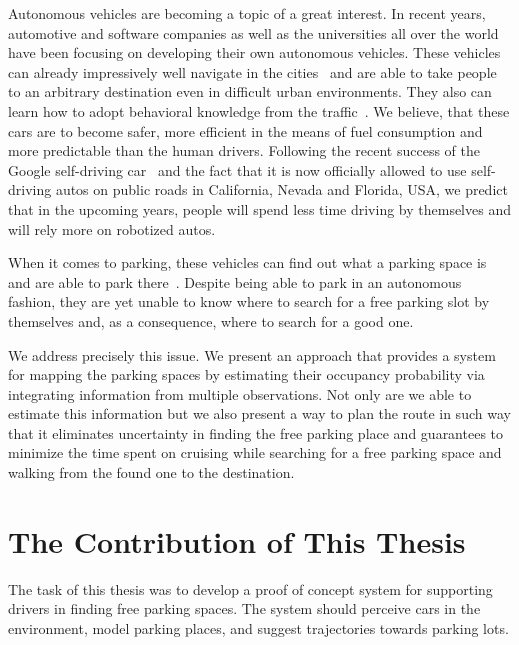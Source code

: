 Autonomous vehicles are becoming a topic of a great interest. In recent years,
automotive and software companies as well as the universities all over the
world have been focusing on developing their own autonomous vehicles. These
vehicles can already impressively well navigate in the
cities~\cite{stanley_auto_car,perceprion_drivec_car,lima13,daimler} and are
able to take people to an arbitrary destination even in difficult urban
environments. They also can learn how to adopt behavioral knowledge from the
traffic~\cite{behaviour_learning,spinello10:multiclass}. We believe, that
these cars are to become safer, more efficient in the means of fuel
consumption and more predictable than the human drivers. Following the recent
success of the Google self-driving car~\cite{markoff2010google} and the fact
that it is now officially allowed to use self-driving autos on public roads in
California, Nevada and Florida, USA, we predict that in the upcoming years,
people will spend less time driving by themselves and will rely more on
robotized autos.

When it comes to parking, these vehicles can find out what a parking space is
and are able to park
there~\cite{auto_cars_burgard,auto_parking09,auto_park2_11}. Despite being
able to park in an autonomous fashion, they are yet unable to know where to
search for a free parking slot by themselves and, as a consequence, where to
search for a good one.

We address precisely this issue. We present an approach that provides a system
for mapping the parking spaces by estimating their occupancy probability via
integrating information from multiple observations. Not only are we able to
estimate this information but we also present a way to plan the route in such
way that it eliminates uncertainty in finding the free parking place and
guarantees to minimize the time spent on cruising while searching for a free
parking space and walking from the found one to the destination.

\section{The Contribution of This Thesis} %
\label{sec:the_contribution_of_this_thesis}

    The task of this thesis was to develop a proof of concept system for
    supporting drivers in finding free parking spaces. The system should
    perceive cars in the environment, model parking places, and suggest
    trajectories towards parking lots.

